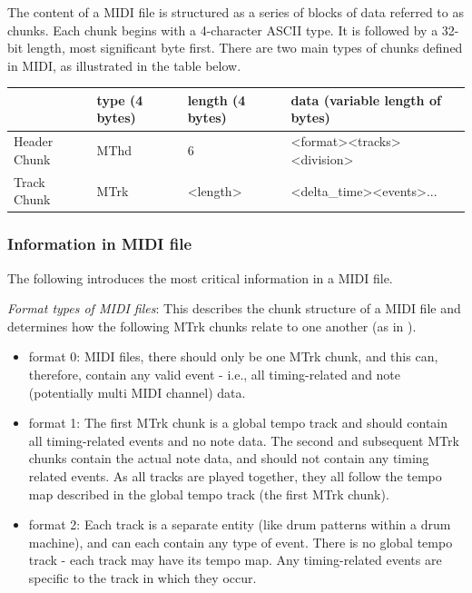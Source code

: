 \documentclass[runningheads]{llncs}
\begin{document}
\label{gloss:chunk}
The content of a MIDI file is structured as a series of blocks of data referred to as chunks. Each chunk begins with a 4-character ASCII type. It is followed by a 32-bit length, most significant byte first. There are two main types of chunks defined in MIDI, as illustrated in the table below.
\label{gloss:header_chunk}
\renewcommand{\arraystretch}{1.0}
\begin{center}
	\begin{tabu}{|l|m{5em}|m{5em}|m{13em}|}
	   \hline
	        & type \newline (4 bytes)
	        & length \newline (4 bytes) 
	        & data \newline (variable length of bytes) \\
		\hline
		Header Chunk & MThd & 6 & <format><tracks><division>\\ 
		\hline
		Track Chunk & MTrk & <length> & <delta\_time><events>... \\  
		\hline
	\end{tabu}
\end{center}

\subsubsection{Information in MIDI file}The following introduces the most critical information in a MIDI file.

\noindent\textit{Format types of MIDI files}: This describes the chunk structure of a MIDI file and determines how the following MTrk chunks relate to one another (as in \cite{midisoft}).

    \begin{itemize}
     \item format 0: MIDI files, there should only be one MTrk chunk, and this can, therefore, contain any valid event - i.e., all timing-related and note (potentially multi MIDI channel) data.
     \item format 1: The first MTrk chunk is a global tempo track and should contain all timing-related events and no note data. The second and subsequent MTrk chunks contain the actual note data, and should not contain any timing related events. As all tracks are played together, they all follow the tempo map described in the global tempo track (the first MTrk chunk).
     \item format 2: Each track is a separate entity (like drum patterns within a drum machine), and can each contain any type of event. There is no global tempo track - each track may have its tempo map. Any timing-related events are specific to the track in which they occur.
    \end{itemize}
    
\end{document}
